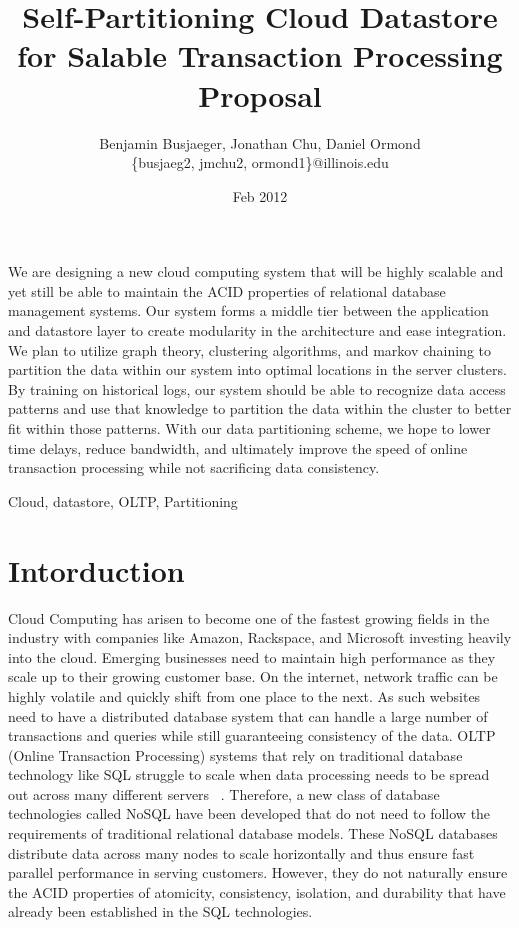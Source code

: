 \documentclass[10pt,final,journal]{IEEEtran}
\begin{document}
\title{Self-Partitioning Cloud Datastore for Salable Transaction Processing Proposal}
\author{Benjamin Busjaeger, Jonathan Chu, Daniel Ormond \\
\{busjaeg2, jmchu2, ormond1\}@illinois.edu}
\date{Feb 2012}
\maketitle

We are designing a new cloud computing system that will be highly scalable and yet still be able to maintain the ACID properties of relational database management systems. Our system forms a middle tier between the application and datastore layer to create modularity in the architecture and ease integration. We plan to utilize graph theory, clustering algorithms, and markov chaining to partition the data within our system into optimal locations in the server clusters. By training on historical logs, our system should be able to recognize data access patterns and use that knowledge to partition the data within the cluster to better fit within those patterns. With our data partitioning scheme, we hope to lower time delays, reduce bandwidth, and ultimately improve the speed of online transaction processing while not sacrificing data consistency.

Cloud, datastore, OLTP, Partitioning


\section{Intorduction}
Cloud Computing has arisen to become one of the fastest growing fields in the industry with companies like Amazon, Rackspace, and Microsoft investing heavily into the cloud. Emerging businesses need to maintain high performance as they scale up to their growing customer base. On the internet, network traffic can be highly volatile and quickly shift from one place to the next. As such websites need to have a distributed database system that can handle a large number of transactions and queries while still guaranteeing consistency of the data. OLTP (Online Transaction Processing) systems that rely on traditional database technology like SQL struggle to scale when data processing needs to be spread out across many different servers ~\cite{Malkowski:2010:EAD:1774088.1774449}. Therefore, a new class of database technologies called NoSQL have been developed that do not need to follow the requirements of traditional relational database models. These NoSQL databases distribute data across many nodes to scale horizontally and thus ensure fast parallel performance in serving customers.  However, they do not naturally ensure the ACID properties of atomicity, consistency, isolation, and durability that have already been established in the SQL technologies.
\end{document}
